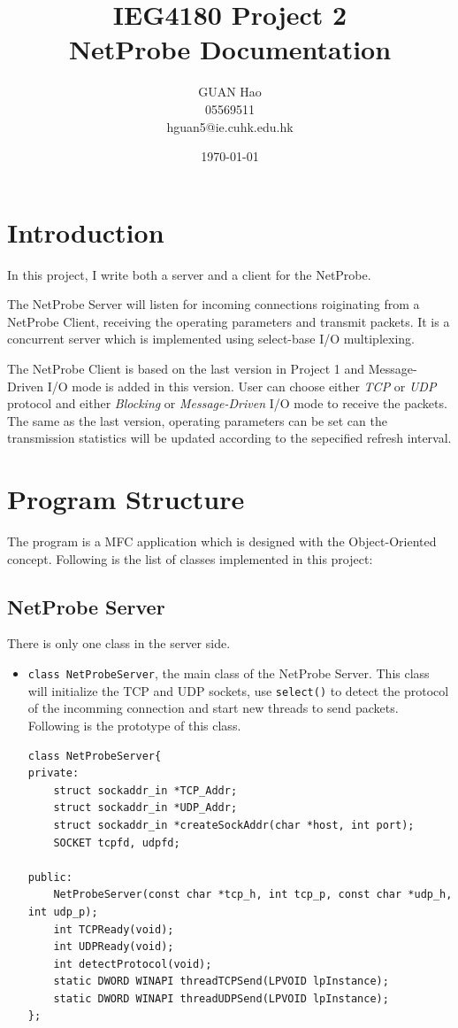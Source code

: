 \documentclass[11pt]{article}
\title{IEG4180 Project 2\\NetProbe Documentation}
\author{GUAN Hao\\05569511\\hguan5@ie.cuhk.edu.hk}
\date{\today}
\begin{document}
\maketitle
\section{Introduction}
In this project, I write both a server and a client for the NetProbe.

The NetProbe Server will listen for incoming connections roiginating from a NetProbe Client, receiving the operating parameters and transmit packets. It is a concurrent server which is implemented using select-base I/O multiplexing.

The NetProbe Client is based on the last version in Project 1 and Message-Driven I/O mode is added in this version. User can choose either {\em TCP} or {\em UDP} protocol and either {\em Blocking} or {\em Message-Driven} I/O mode to receive the packets. The same as the last version, operating parameters can be set can the transmission statistics will be updated according to the sepecified refresh interval.
\section{Program Structure}
The program is a MFC application which is designed with the Object-Oriented concept. Following is the list of classes implemented in this project:
\subsection{NetProbe Server}
There is only one class in the server side.
\begin{itemize}
\item {\tt class NetProbeServer}, the main class of the NetProbe Server. This class will initialize the TCP and UDP sockets, use {\tt select()} to detect the protocol of the incomming connection and start new threads to send packets. Following is the prototype of this class.  
\begin{lstlisting}
class NetProbeServer{
private: 
	struct sockaddr_in *TCP_Addr;
	struct sockaddr_in *UDP_Addr;
	struct sockaddr_in *createSockAddr(char *host, int port);
	SOCKET tcpfd, udpfd;

public:
	NetProbeServer(const char *tcp_h, int tcp_p, const char *udp_h, int udp_p);
	int TCPReady(void);
	int UDPReady(void);
	int detectProtocol(void);
	static DWORD WINAPI threadTCPSend(LPVOID lpInstance);
	static DWORD WINAPI threadUDPSend(LPVOID lpInstance);
};
\end{lstlisting}
\end{itemize}
\end{document}
